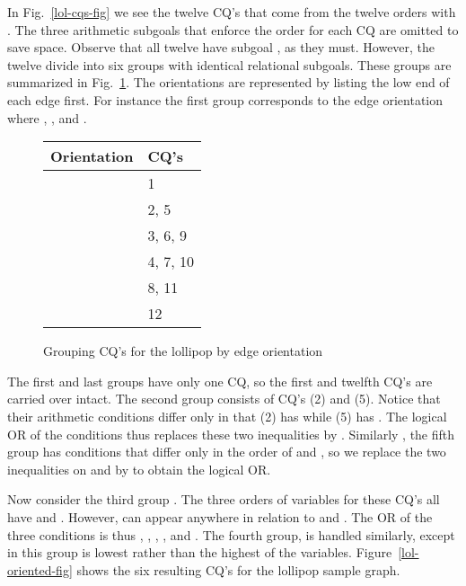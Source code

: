\begin{example}
\label{lol-ex}
In Fig.~\ref{lol-cqs-fig} we see the twelve CQ's that come from the twelve orders with .
The three arithmetic subgoals that enforce the order for each CQ are omitted to save space.
Observe that all twelve have subgoal , as they must.  However, the twelve divide into six groups with identical relational subgoals.  These groups are summarized in Fig.~\ref{lol-groups-fig}.  The orientations are represented by listing the low end of each edge first.  For instance the first group corresponds to the edge orientation where , , and .

\begin{figure}[htfb]

\begin{center}
\begin{tabular}{l l}
Orientation & CQ's\\
\hline
 & 1\\
 & 2, 5\\
 & 3, 6, 9\\
 & 4, 7, 10\\
 & 8, 11\\
 & 12\\
\end{tabular}
\end{center}

\caption{Grouping CQ's for the lollipop by edge orientation}
\label{lol-groups-fig}

\end{figure}

The first and last groups have only one CQ, so the first and twelfth CQ's are carried over intact.
The second group consists of CQ's (2) and (5).  Notice that their arithmetic conditions differ only in that (2) has  while (5) has .  The logical OR of the conditions thus replaces these two inequalities by .   Similarly , the fifth group  has conditions that differ only in the order of  and , so we replace the two inequalities on  and  by  to obtain the logical OR.

Now consider the third group .  The three orders of variables for these CQ's all have  and .  However,  can appear anywhere in relation to  and .  The OR of the three conditions is thus , , , , and .  The fourth group,  is handled similarly, except in this group  is lowest rather than the highest of the variables.  Figure~\ref{lol-oriented-fig} shows the six resulting CQ's for the lollipop sample graph.
\end{example}

